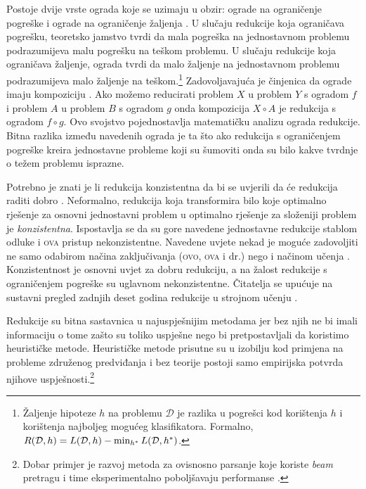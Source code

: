 Postoje dvije vrste ograda koje se uzimaju u obzir: ograde na ograničenje
pogreške  i ograde na ograničenje žaljenja . U slučaju redukcije koja ograničava pogrešku, teoretsko jamstvo tvrdi
da mala pogreška na jednostavnom problemu podrazumijeva malu pogrešku na teškom
problemu. U slučaju redukcije koja ograničava žaljenje, ograda tvrdi da malo
žaljenje na jednostavnom problemu podrazumijeva malo žaljenje na
teškom.\footnote{Žaljenje hipoteze $h$ na problemu $\mathcal{D}$ je razlika u
pogrešci kod korištenja $h$ i korištenja najboljeg mogućeg klasifikatora.
Formalno, $R(\mathcal{D}, h) = L(\mathcal{D}, h) - \min_{h\ssymbol{1}}
L(\mathcal{D}, h\ssymbol{1})$.} Zadovoljavajuća je činjenica da ograde imaju
kompoziciju \citep{beygelzimer2005error}. Ako možemo reducirati problem $X$ u
problem $Y$ s ogradom $f$ i problem $A$ u problem $B$ s ogradom $g$ onda
kompozicija $X \circ A$ je redukcija s ogradom $f \circ g$. Ovo svojstvo
pojednostavlja matematičku analizu ograda redukcije. Bitna razlika između
navedenih ograda je ta što ako redukcija s ograničenjem pogreške kreira
jednostavne probleme koji su šumoviti onda su bilo kakve tvrdnje o težem
problemu isprazne.

Potrebno je znati je li redukcija konzistentna  da bi se
uvjerili da će redukcija raditi dobro \citep{beygelzimer2009error,
daume15reductions}. Neformalno, redukcija koja transformira bilo koje optimalno
rješenje za osnovni jednostavni problem u optimalno rješenje za složeniji
problem je \textit{konzistentna}. Ispostavlja se da su gore navedene jednostavne
redukcije stablom odluke i \textsc{ova} pristup nekonzistentne. Navedene uvjete
nekad je moguće zadovoljiti ne samo odabirom načina zaključivanja (\textsc{ovo},
\textsc{ova} i dr.) nego i načinom učenja \citep{abe2004iterative,
beygelzimer2005weighted}. Konzistentnost je osnovni uvjet za dobru redukciju, a
na žalost redukcije s ograničenjem pogreške su uglavnom nekonzistentne.
Čitatelja se upućuje na sustavni pregled zadnjih deset godina redukcije u
strojnom učenju \citep{daume15reductions}.

Redukcije su bitna sastavnica u najuspješnijim \lts{} metodama jer bez njih ne
bi imali informaciju o tome zašto su toliko uspješne nego bi pretpostavljali da
koristimo heurističke metode. Heurističke metode prisutne su u izobilju kod
primjena na probleme združenog predviđanja i bez teorije postoji samo empirijska
potvrda njihove uspješnosti.\footnote{Dobar primjer je razvoj metoda za
ovisnosno parsanje koje koriste \textit{beam} pretragu i time eksperimentalno
poboljšavaju performanse \citep{zhang2011transition, bohnet2012transition}.}
